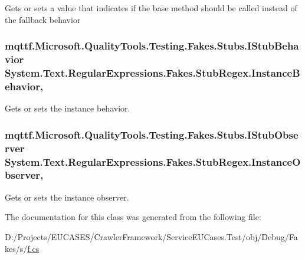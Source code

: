Gets or sets a value that indicates if the base method should be called instead of the fallback behavior

\hypertarget{class_system_1_1_text_1_1_regular_expressions_1_1_fakes_1_1_stub_regex_a2dfa25cfcb4b303f082bdead9dc8b108}{
\subsubsection[{Instance\-Behavior}]{\setlength{\rightskip}{0pt plus 5cm}mqttf.\-Microsoft.\-Quality\-Tools.\-Testing.\-Fakes.\-Stubs.\-I\-Stub\-Behavior System.\-Text.\-Regular\-Expressions.\-Fakes.\-Stub\-Regex.\-Instance\-Behavior\hspace{0.3cm}{\ttfamily [get]}, {\ttfamily [set]}}}\label{class_system_1_1_text_1_1_regular_expressions_1_1_fakes_1_1_stub_regex_a2dfa25cfcb4b303f082bdead9dc8b108}


Gets or sets the instance behavior.

\hypertarget{class_system_1_1_text_1_1_regular_expressions_1_1_fakes_1_1_stub_regex_a5babb41cd91a6c02ea937b506183a9f6}{
\subsubsection[{Instance\-Observer}]{\setlength{\rightskip}{0pt plus 5cm}mqttf.\-Microsoft.\-Quality\-Tools.\-Testing.\-Fakes.\-Stubs.\-I\-Stub\-Observer System.\-Text.\-Regular\-Expressions.\-Fakes.\-Stub\-Regex.\-Instance\-Observer\hspace{0.3cm}{\ttfamily [get]}, {\ttfamily [set]}}}\label{class_system_1_1_text_1_1_regular_expressions_1_1_fakes_1_1_stub_regex_a5babb41cd91a6c02ea937b506183a9f6}


Gets or sets the instance observer.



The documentation for this class was generated from the following file\-:\begin{DoxyCompactItemize}
\item 
D\-:/\-Projects/\-E\-U\-C\-A\-S\-E\-S/\-Crawler\-Framework/\-Service\-E\-U\-Cases.\-Test/obj/\-Debug/\-Fakes/s/\hyperlink{s_2f_8cs}{f.\-cs}\end{DoxyCompactItemize}
